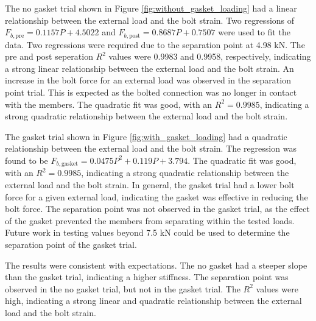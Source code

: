 
The no gasket trial shown in Figure \ref{fig:without_gasket_loading} had a linear relationship between the external load and the bolt strain. Two regressions of $F_{b, \text{pre}} = 0.1157 P + 4.5022$ and $F_{b, \text{post}} = 0.8687 P + 0.7507$ were used to fit the data. Two regressions were required due to the separation point at 4.98 kN. The pre and post seperation $R^2$ values were 0.9983 and 0.9958, respectively, indicating a strong linear relationship between the external load and the bolt strain. An increase in the bolt force for an external load was observed in the separation point trial. This is expected as the bolted connection was no longer in contact with the members. The quadratic fit was good, with an $R^2 = 0.9985$, indicating a strong quadratic relationship between the external load and the bolt strain.

The gasket trial shown in Figure \ref{fig:with_gasket_loading} had a quadratic relationship between the external load and the bolt strain. The regression was found to be $F_{b, \text{gasket}} = 0.0475 P^2 + 0.119 P + 3.794$. The quadratic fit was good, with an $R^2 = 0.9985$, indicating a strong quadratic relationship between the external load and the bolt strain. In general, the gasket trial had a lower bolt force for a given external load, indicating the gasket was effective in reducing the bolt force. The separation point was not observed in the gasket trial, as the effect of the gasket prevented the members from separating within the tested loads. Future work in testing values beyond 7.5 kN could be used to determine the separation point of the gasket trial.

The results were consistent with expectations. The no gasket had a steeper slope than the gasket trial, indicating a higher stiffness. The separation point was observed in the no gasket trial, but not in the gasket trial. The $R^2$ values were high, indicating a strong linear and quadratic relationship between the external load and the bolt strain.

